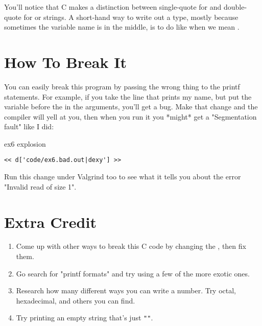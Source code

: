 You'll notice that C makes a distinction between single-quote for 
and double-quote for  or strings.  A short-hand way to write
out a type, mostly because sometimes the variable name is in the middle, is
to do like  when we mean .

\section{How To Break It}

You can easily break this program by passing the wrong thing to the 
printf statements.  For example, if you take the line that prints
my name, but put the  variable before the 
in the arguments, you'll get a bug.  Make that change and the compiler will
yell at you, then when you run it you *might* get a "Segmentation fault"
like I did:

\begin{code}{ex6 explosion}
\begin{lstlisting}
<< d['code/ex6.bad.out|dexy'] >>
\end{lstlisting}
\end{code}

Run this change under Valgrind too to see what it tells you about
the error "Invalid read of size 1".

\section{Extra Credit}

\begin{enumerate}
\item Come up with other ways to break this C code by changing the
    , then fix them.
\item Go search for "printf formats" and try using a few of the
    more exotic ones.
\item Research how many different ways you can write a number. Try
    octal, hexadecimal, and others you can find.
\item Try printing an empty string that's just \verb|""|.
\end{enumerate}

